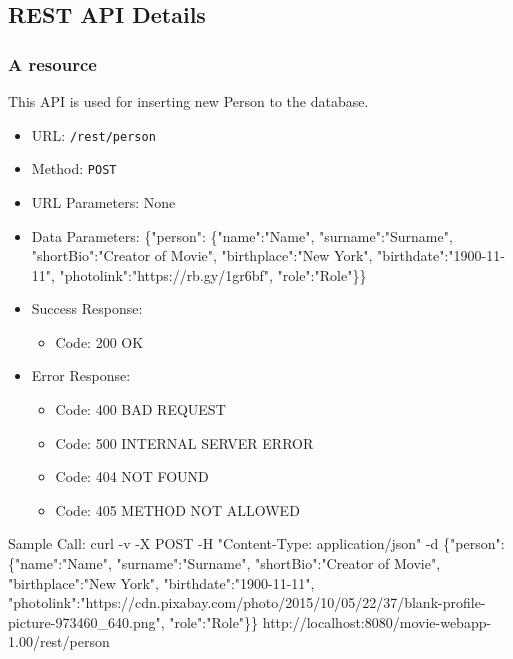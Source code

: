 \subsection{REST API Details}


\subsubsection*{A resource}


This API is used for inserting new Person to the database.


\begin{itemize}
    \item URL: \texttt{/rest/person}
    \item Method: \texttt{POST}
    \item URL Parameters: None
    \item Data Parameters: 
    \{"person":
    \{"name":"Name", 
    "surname":"Surname", 
    "shortBio":"Creator of Movie", 
    "birthplace":"New York", 
    "birthdate":"1900-11-11", 
    "photolink":"https://rb.gy/1gr6bf", 
    "role":"Role"\}\}

    \item Success Response:
        \begin{itemize}
        \item Code: 200 OK
        \end{itemize}
        
    \item Error Response:
        \begin{itemize}
        \item Code: 400 BAD REQUEST
        \item Code: 500 INTERNAL SERVER ERROR
        \item Code: 404 NOT FOUND
        \item Code: 405 METHOD NOT ALLOWED
        \end{itemize}
    
\end{itemize}
    \item Sample Call:
        curl -v -X POST -H "Content-Type: application/json" -d \{"person":
    \{"name":"Name", 
    "surname":"Surname", 
    "shortBio":"Creator of Movie", 
    "birthplace":"New York", 
    "birthdate":"1900-11-11", 
    "photolink":"https://cdn.pixabay.com/photo/2015/10/05/22/37/blank-profile-picture-973460\_640.png", 
    "role":"Role"\}\} http://localhost:8080/movie-webapp-1.00/rest/person

